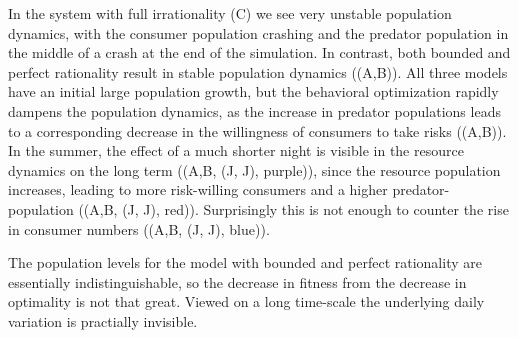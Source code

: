 In the system with full irrationality (C) we see very unstable population dynamics, with the consumer population crashing and the predator population in the middle of a crash at the end of the simulation. In contrast, both bounded and perfect rationality result in stable population dynamics ((A,B)). All three models have an initial large population growth, but the behavioral optimization rapidly dampens the population dynamics, as the increase in predator populations leads to a corresponding decrease in the willingness of consumers to take risks ((A,B)). In the summer, the effect of a much shorter night is visible in the resource dynamics on the long term ((A,B, (J, J), purple)), since the resource population increases, leading to more risk-willing consumers and a higher predator-population ((A,B, (J, J), red)). Surprisingly this is not enough to counter the rise in consumer numbers ((A,B, (J, J), blue)).

 The population levels for the model with bounded and perfect rationality are essentially indistinguishable, so the decrease in fitness from the decrease in optimality is not that great. Viewed on a long time-scale the underlying daily variation is practially invisible.

